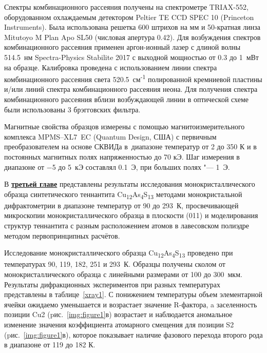 Спектры комбинационного рассеяния получены на спектрометре TRIAX-552, оборудованном охлаждаемым детектором Peltier TE CCD SPEC 10 (Princeton Instruments).
Была использована решетка 600 штрихов на мм и 50-кратная линза Mitutoyo M Plan Apo SL50 (числовая апертура 0.42).
Для возбуждения спектров комбинационного рассеяния применен аргон-ионный лазер с длиной волны 514.5~нм Spectra-Physics Stabilite 2017 с выходной мощностью от 0.3 до 1~мВт на образце. Калибровка проведена с использованием линии спектра комбинационного рассеяния света 520.5~см\textsuperscript{-1} полированной кремниевой пластины и/или линий спектра комбинационного рассеяния неона.
Для получения спектра комбинационного рассеяния вблизи возбуждающей линии в оптической схеме были использованы 3  брэгговских фильтра.

Магнитные свойства образцов измерены с
помощью магнитоизмерительного комплекса
MPMS--XL7~EC (Quantum Design, США) с первичным преобразователем на основе СКВИДа в~диапазоне температур от 2 до 350 К и в постоянных магнитных полях напряженностью до 70 кЭ. Шаг измерения в диапазоне от $-$5 до 5~кЭ составлял 0.1~Э, при больших полях "--- 1~Э.

В \underline{\textbf{третьей главе}} представлены результаты исследования монокристаллического образца синтетического теннантита Cu\textsubscript{12}As\textsubscript{4}S\textsubscript{13} методами монокристальной дифрактометрии в диапазоне температур от 90 до 293~К, просвечивающей микроскопии монокристаллического образца в плоскости (011) и моделирования структур теннантита с разным расположением атомов в лавесовском полиэдре методом первопринципных расчётов.



Исследование монокристаллического образца  Cu\textsubscript{12}As\textsubscript{4}S\textsubscript{13} проведено при температурах 90, 119, 182, 251 и 293~К. Образцы получены сколом от монокристаллического образца с линейными размерами от 100 до 300~мкм.  Результаты дифракционных экспериментов при разных температурах представлены в таблице~\ref{xray1}. С понижением температуры объем элементарной ячейки ожидаемо уменьшается и возрастает значение R-фактора, a  заселенность позиции Cu2 (pис.~\ref{img:figure1}в) возрастает и  наблюдается аномальное изменение значения коэффициента атомарного смещения для позиции S2 (pис.~\ref{img:figure1}в), которое показывает наличие фазового перехода второго рода в диапазоне от 119 до 182 К.



